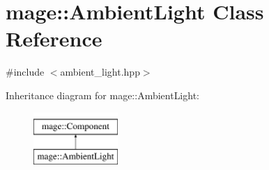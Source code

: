\hypertarget{classmage_1_1_ambient_light}{}\section{mage\+:\+:Ambient\+Light Class Reference}
\label{classmage_1_1_ambient_light}


{\ttfamily \#include $<$ambient\+\_\+light.\+hpp$>$}

Inheritance diagram for mage\+:\+:Ambient\+Light\+:\begin{figure}[H]
\begin{center}
\leavevmode
\includegraphics[height=2.000000cm]{classmage_1_1_ambient_light}
\end{center}
\end{figure}
